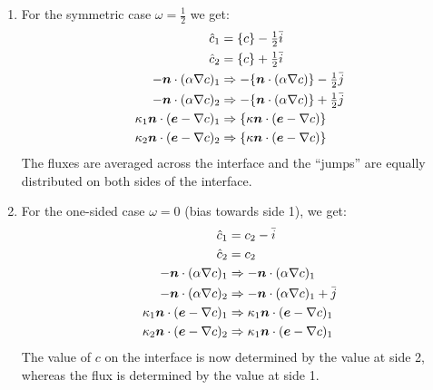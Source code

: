 \begin{enumerate}
   \item For the symmetric case $\omega=\frac12$ we get:
\begin{align}
   \hat c_1 &= \{c\}-\tfrac12\bar i\\
   \hat c_2 &= \{c\}+\tfrac12\bar i\\
   -\boldsymbol{n}\cdot(\alpha\nabla c)_1&\Rightarrow
            -\{\boldsymbol{n}\cdot(\alpha\nabla c)\} - \tfrac12 \bar j \\
   -\boldsymbol{n}\cdot(\alpha\nabla c)_2&\Rightarrow
            -\{\boldsymbol{n}\cdot(\alpha\nabla c)\} + \tfrac12\bar j \\
   \kappa_1\boldsymbol{n}\cdot(\boldsymbol{e}- \nabla c)_1&\Rightarrow
            \{\kappa\boldsymbol{n}\cdot(\boldsymbol{e}- \nabla c)\}\\
   \kappa_2\boldsymbol{n}\cdot(\boldsymbol{e}- \nabla c)_2&\Rightarrow
            \{\kappa\boldsymbol{n}\cdot(\boldsymbol{e}- \nabla c)\}
\end{align}
The fluxes are averaged across the interface and the ``jumps'' are equally
distributed on both sides of the interface.
   \item For the one-sided case $\omega=0$ (bias towards side 1), we get:
\begin{align}
   \hat c_1 &= c_2-\bar i\\
   \hat c_2 &= c_2\\
   -\boldsymbol{n}\cdot(\alpha\nabla c)_1&\Rightarrow
            -\boldsymbol{n}\cdot(\alpha\nabla c)_1 \\
   -\boldsymbol{n}\cdot(\alpha\nabla c)_2&\Rightarrow
            -\boldsymbol{n}\cdot(\alpha\nabla c)_1 + \bar j \\
   \kappa_1\boldsymbol{n}\cdot(\boldsymbol{e}- \nabla c)_1&\Rightarrow
            \kappa_1\boldsymbol{n}\cdot(\boldsymbol{e}- \nabla c)_1\\
   \kappa_2\boldsymbol{n}\cdot(\boldsymbol{e}- \nabla c)_2&\Rightarrow
            \kappa_1\boldsymbol{n}\cdot(\boldsymbol{e}- \nabla c)_1
\end{align}
The value of $c$ on the interface is now determined by the value at side 2,
whereas the flux is determined by the value at side 1.
\end{enumerate}

